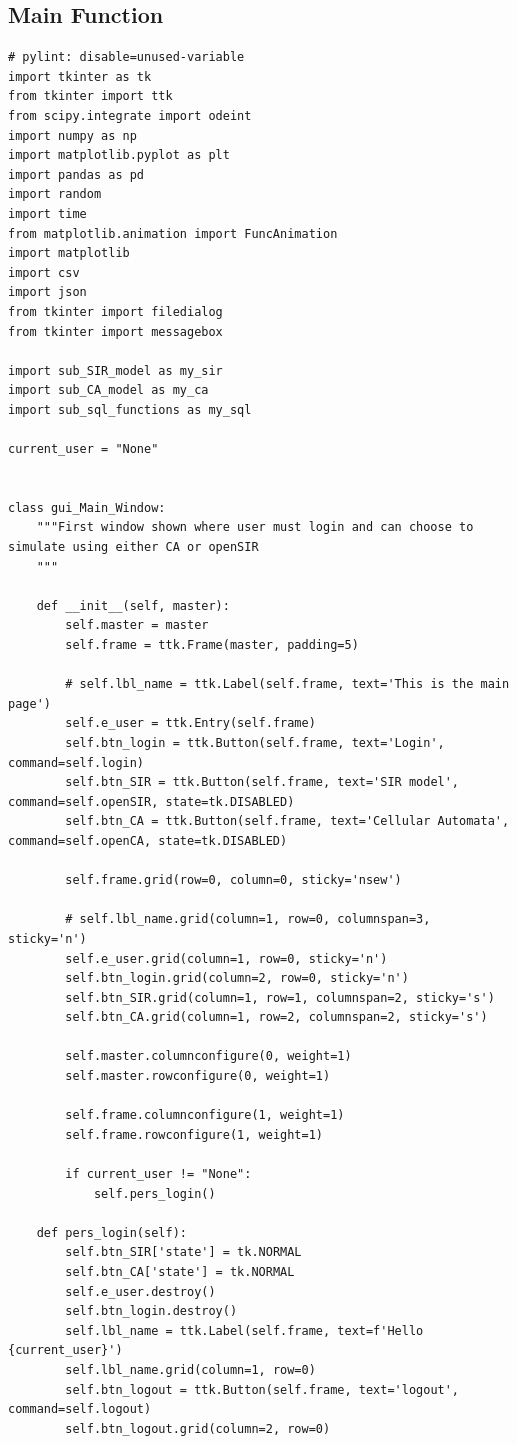 \documentclass[11pt, a4paper]{article}
\begin{document}
\subsection{Main Function}
\begin{lstlisting}
# pylint: disable=unused-variable
import tkinter as tk
from tkinter import ttk
from scipy.integrate import odeint
import numpy as np
import matplotlib.pyplot as plt
import pandas as pd
import random
import time
from matplotlib.animation import FuncAnimation
import matplotlib
import csv
import json
from tkinter import filedialog
from tkinter import messagebox

import sub_SIR_model as my_sir
import sub_CA_model as my_ca
import sub_sql_functions as my_sql

current_user = "None"


class gui_Main_Window:
    """First window shown where user must login and can choose to simulate using either CA or openSIR
    """

    def __init__(self, master):
        self.master = master
        self.frame = ttk.Frame(master, padding=5)

        # self.lbl_name = ttk.Label(self.frame, text='This is the main page')
        self.e_user = ttk.Entry(self.frame)
        self.btn_login = ttk.Button(self.frame, text='Login', command=self.login)
        self.btn_SIR = ttk.Button(self.frame, text='SIR model', command=self.openSIR, state=tk.DISABLED)
        self.btn_CA = ttk.Button(self.frame, text='Cellular Automata', command=self.openCA, state=tk.DISABLED)

        self.frame.grid(row=0, column=0, sticky='nsew')

        # self.lbl_name.grid(column=1, row=0, columnspan=3, sticky='n')
        self.e_user.grid(column=1, row=0, sticky='n')
        self.btn_login.grid(column=2, row=0, sticky='n')
        self.btn_SIR.grid(column=1, row=1, columnspan=2, sticky='s')
        self.btn_CA.grid(column=1, row=2, columnspan=2, sticky='s')

        self.master.columnconfigure(0, weight=1)
        self.master.rowconfigure(0, weight=1)

        self.frame.columnconfigure(1, weight=1)
        self.frame.rowconfigure(1, weight=1)

        if current_user != "None":
            self.pers_login()

    def pers_login(self):
        self.btn_SIR['state'] = tk.NORMAL
        self.btn_CA['state'] = tk.NORMAL
        self.e_user.destroy()
        self.btn_login.destroy()
        self.lbl_name = ttk.Label(self.frame, text=f'Hello {current_user}')
        self.lbl_name.grid(column=1, row=0)
        self.btn_logout = ttk.Button(self.frame, text='logout', command=self.logout)
        self.btn_logout.grid(column=2, row=0)


\end{lstlisting}
\end{document}
